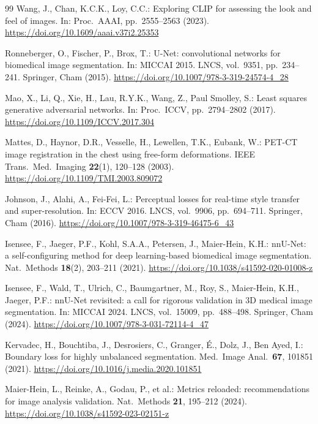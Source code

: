 \documentclass[runningheads]{llncs}
\begin{document}
\begin{thebibliography}{99}
Wang, J., Chan, K.C.K., Loy, C.C.: Exploring CLIP for assessing the look and feel
of images. In: Proc.\ AAAI, pp.~2555--2563 (2023).
\url{https://doi.org/10.1609/aaai.v37i2.25353}

Ronneberger, O., Fischer, P., Brox, T.: U-Net: convolutional networks for
biomedical image segmentation. In: MICCAI 2015. LNCS, vol.~9351, pp.~234--241.
Springer, Cham (2015). \url{https://doi.org/10.1007/978-3-319-24574-4_28}

Mao, X., Li, Q., Xie, H., Lau, R.Y.K., Wang, Z., Paul Smolley, S.: Least squares
generative adversarial networks. In: Proc.\ ICCV, pp.~2794--2802 (2017).
\url{https://doi.org/10.1109/ICCV.2017.304}

Mattes, D., Haynor, D.R., Vesselle, H., Lewellen, T.K., Eubank, W.: PET-CT image
registration in the chest using free-form deformations. IEEE Trans.\ Med.\
Imaging \textbf{22}(1), 120--128 (2003).
\url{https://doi.org/10.1109/TMI.2003.809072}

Johnson, J., Alahi, A., Fei-Fei, L.: Perceptual losses for real-time style
transfer and super-resolution. In: ECCV 2016. LNCS, vol.~9906, pp.~694--711.
Springer, Cham (2016). \url{https://doi.org/10.1007/978-3-319-46475-6_43}

Isensee, F., Jaeger, P.F., Kohl, S.A.A., Petersen, J., Maier-Hein, K.H.: nnU-Net:
a self-configuring method for deep learning-based biomedical image segmentation.
Nat.\ Methods \textbf{18}(2), 203--211 (2021).
\url{https://doi.org/10.1038/s41592-020-01008-z}

Isensee, F., Wald, T., Ulrich, C., Baumgartner, M., Roy, S., Maier-Hein, K.H.,
Jaeger, P.F.: nnU-Net revisited: a call for rigorous validation in 3D medical
image segmentation. In: MICCAI 2024. LNCS, vol.~15009, pp.~488--498. Springer,
Cham (2024). \url{https://doi.org/10.1007/978-3-031-72114-4_47}

Kervadec, H., Bouchtiba, J., Desrosiers, C., Granger, \'E., Dolz, J., Ben Ayed,
I.: Boundary loss for highly unbalanced segmentation. Med.\ Image Anal.\
\textbf{67}, 101851 (2021). \url{https://doi.org/10.1016/j.media.2020.101851}

\bibitem{maierhein2024metrics}
Maier-Hein, L., Reinke, A., Godau, P., et al.: Metrics reloaded: recommendations
for image analysis validation. Nat.\ Methods \textbf{21}, 195--212 (2024).
\url{https://doi.org/10.1038/s41592-023-02151-z}

\end{thebibliography}
\end{document}
